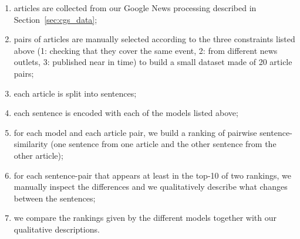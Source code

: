 \begin{enumerate}
    \item articles are collected from our Google News processing described in Section~\ref{sec:cgs_data};
    \item pairs of articles are manually selected according to the three constraints listed above (1: checking that they cover the same event, 2: from different news outlets, 3: published near in time) to build a small dataset made of 20 article pairs;
    \item each article is split into sentences;
    \item each sentence is encoded with each of the models listed above;
    \item for each model and each article pair, we build a ranking of pairwise sentence-similarity (one sentence from one article and the other sentence from the other article);
    \item for each sentence-pair that appears at least in the top-10 of two rankings, we manually inspect the differences and we qualitatively describe what changes between the sentences;
    \item we compare the rankings given by the different models together with our qualitative descriptions.
\end{enumerate}



